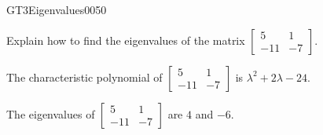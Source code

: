 \newpage




\begin{exercise}{GT3}{Eigenvalues}{0050} 
\begin{exerciseStatement} 

Explain how to find the eigenvalues of the matrix \(\left[\begin{array}{cc}
5 & 1 \\
-11 & -7
\end{array}\right]\).

 \end{exerciseStatement}
 \begin{exerciseAnswer} 

The characteristic polynomial of \(\left[\begin{array}{cc}
5 & 1 \\
-11 & -7
\end{array}\right]\) is \(\lambda^{2} + 2 \lambda - 24\).

 

The eigenvalues of \(\left[\begin{array}{cc}
5 & 1 \\
-11 & -7
\end{array}\right]\) are \(4\) and \(-6\).

 \end{exerciseAnswer}
 \end{exercise}




